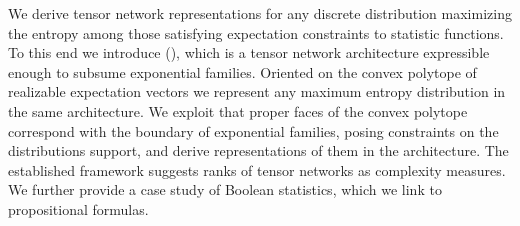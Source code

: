 We derive tensor network representations for any discrete distribution maximizing the entropy among those satisfying expectation constraints to statistic functions.
To this end we introduce \ComputationActivationNetworks{} (\CompActNets{}), which is a tensor network architecture expressible enough to subsume exponential families.
Oriented on the convex polytope of realizable expectation vectors we represent any maximum entropy distribution in the same architecture.
We exploit that proper faces of the convex polytope correspond with the boundary of exponential families, posing constraints on the distributions support, and derive representations of them in the \CompActNet{} architecture.
The established framework suggests ranks of tensor networks as complexity measures.
We further provide a case study of Boolean statistics, which we link to propositional formulas.

